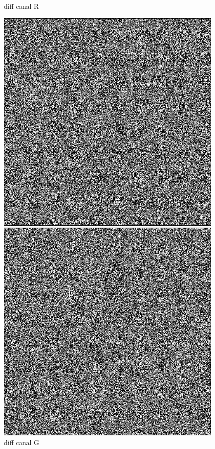 \begin{figure}[!htb]
  \caption{diff canal R}
\endminipage\hfill
{}
  \includegraphics[width=\linewidth]{images/lenablurdiffG.png}
  \caption{diff canal G}
\endminipage\hfill
{}
  \includegraphics[width=\linewidth]{images/lenablurdiffB.png}

\end{figure}
